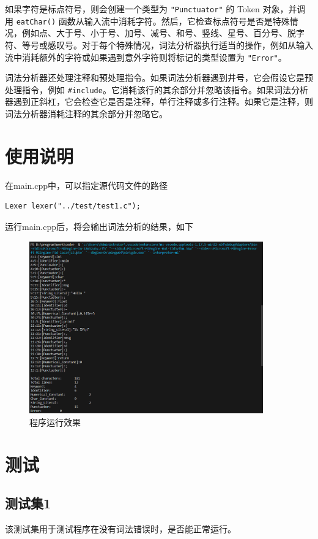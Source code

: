 \documentclass[lang=cn,11pt,a4paper]{elegantpaper}
\begin{document}
如果字符是标点符号，则会创建一个类型为 \lstinline{"Punctuator"} 的 Token 对象，并调用 \lstinline{eatChar()} 函数从输入流中消耗字符。然后，它检查标点符号是否是特殊情况，例如点、大于号、小于号、加号、减号、和号、竖线、星号、百分号、脱字符、等号或感叹号。对于每个特殊情况，词法分析器执行适当的操作，例如从输入流中消耗额外的字符或如果遇到意外字符则将标记的类型设置为 \lstinline{"Error"}。

词法分析器还处理注释和预处理指令。如果词法分析器遇到井号，它会假设它是预处理指令，例如 \lstinline{#include}。它消耗该行的其余部分并忽略该指令。如果词法分析器遇到正斜杠，它会检查它是否是注释，单行注释或多行注释。如果它是注释，则词法分析器消耗注释的其余部分并忽略它。

\section{使用说明}

在main.cpp中，可以指定源代码文件的路径
\begin{lstlisting}[numbers = none]
    Lexer lexer("../test/test1.c");
\end{lstlisting}
运行main.cpp后，将会输出词法分析的结果，如下
\begin{figure}[!htb]
    \centering
    \includegraphics[width=0.9\textwidth]{image/TestResult.png}
    \caption{程序运行效果}
\end{figure}

\clearpage

\section{测试}

\subsection{测试集1}
该测试集用于测试程序在没有词法错误时，是否能正常运行。
\end{document}
